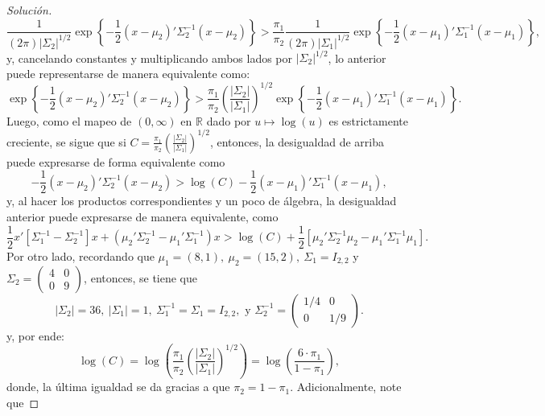 \documentclass[10.5pt,notitlepage]{article}
\newenvironment{solucion}
  {\begin{proof}[Solución]}
  {\end{proof}}
\newcommand{\RR}{\mathbb{R}}
\newcommand{\abs}[1]{\left\lvert #1 \right\rvert}
\newcommand{\corch}[1]{\left[ #1 \right]}
\newcommand{\kis}[1]{\left\{ #1 \right\}}
\newcommand{\pare}[1]{\left( #1 \right)}
\newcommand{\Matrix}[1]{\begin{pmatrix} #1 \end{pmatrix}}
\theoremstyle{plain}
\begin{document}
\begin{solucion}
\begin{equation*}
    \frac{1}{(2\pi)\abs{\Sigma_2}^{1/2}}\exp\kis{-\frac{1}{2}(x - \mu_{2})'\Sigma_{2}^{-1}(x - \mu_2)} >  \frac{\pi_{1}}{\pi_{2}}    \frac{1}{(2\pi)\abs{\Sigma_1}^{1/2}}\exp\kis{-\frac{1}{2}(x - \mu_{1})'\Sigma_{1}^{-1}(x - \mu_1)},  
\end{equation*}
y, cancelando constantes y multiplicando ambos lados por \(\abs{\Sigma_2}^{1/2}\), lo anterior puede representarse de manera equivalente como: 
\begin{equation*}
\exp\kis{-\frac{1}{2}(x - \mu_{2})'\Sigma_{2}^{-1}(x - \mu_2)} >  \frac{\pi_{1}}{\pi_{2}}\pare{\frac{\abs{\Sigma_2}}{\abs{\Sigma_1}}}^{1/2}\exp\kis{-\frac{1}{2}(x - \mu_{1})'\Sigma_{1}^{-1}(x - \mu_1)}.  
\end{equation*}
Luego, como el mapeo de \((0, \infty)\) en \(\RR\) dado por \(u \mapsto \log(u)\) es estrictamente creciente, se sigue que si \(C = \frac{\pi_{1}}{\pi_{2}}\pare{\frac{\abs{\Sigma_2}}{\abs{\Sigma_1}}}^{1/2}\), entonces, la desigualdad de arriba puede expresarse de forma equivalente como
\begin{equation}
    -\frac{1}{2}(x - \mu_2)'\Sigma_{2}^{-1}(x - \mu_2) > \log(C)  -\frac{1}{2}(x - \mu_1)'\Sigma_{1}^{-1}(x - \mu_1),
\end{equation}
y, al hacer los productos correspondientes y un poco de álgebra, la desigualdad anterior puede expresarse de manera equivalente, como 
\begin{equation}\label{lab.40}
    \frac{1}{2}x'\corch{\Sigma_{1}^{-1} - \Sigma_{2}^{-1}}x + (\mu_2'\Sigma_{2}^{-1} - \mu_{1}'\Sigma_{1}^{-1})x > \log(C) + \frac{1}{2}\corch{\mu_{2}'\Sigma_{2}^{-1}\mu_2 - \mu_{1}'\Sigma_{1}^{-1}\mu_1 }.
 \end{equation}
 Por otro lado, recordando que  \(\mu_1 = (8,1), \ \mu_2 = (15,2),\ \Sigma_1 = I_{2,2}\) y \(\Sigma_{2} = \Matrix{4 & 0 \\ 0 & 9}\), entonces, se tiene que 
 \begin{equation*}
     \abs{\Sigma_2} = 36,\  \abs{\Sigma_1} = 1,\  \Sigma_{1}^{-1} = \Sigma_{1} = I_{2,2}, \text{ y } \Sigma_{2}^{-1} = \Matrix{1/4 & 0 \\ 0 & 1/9}.  
 \end{equation*}
 y, por ende: 
 \begin{equation}\label{lab.41}
     \log(C)= \log\pare{\frac{\pi_{1}}{\pi_{2}}\pare{\frac{\abs{\Sigma_2}}{\abs{\Sigma_1}}}^{1/2}} =\log\pare{\frac{6\cdot\pi_{1}}{1 -\pi_{1}}}, 
 \end{equation}
 donde, la última igualdad se da gracias a que \(\pi_2 = 1 - \pi_1.\) Adicionalmente, note que 

\end{solucion}
\end{document}
